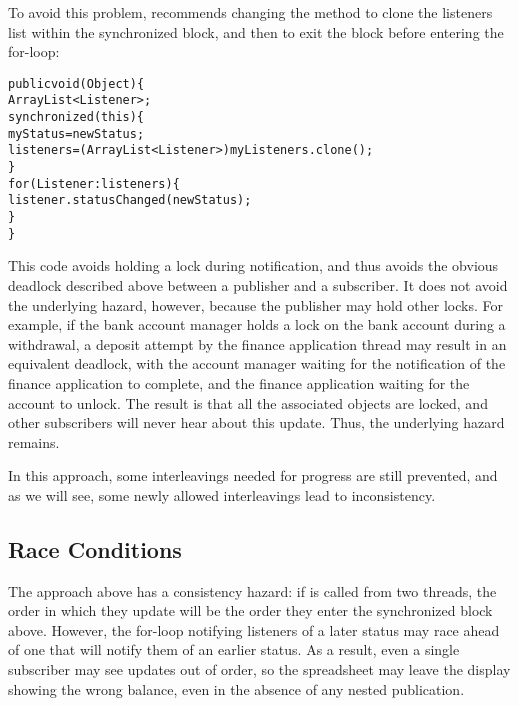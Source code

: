 \documentclass{llncs}
\begin{document}
To avoid this problem, \cite{Englander:beans} recommends changing the
 method to clone the listeners list within the
synchronized block, and then to exit the block before entering the
for-loop:
%
\begin{alltt}
    public void (Object ) \{
        ArrayList<Listener> ;
        synchronized (this) \{
            myStatus = newStatus;
            listeners = (ArrayList<Listener>)myListeners.clone();
        \}
        for (Listener : listeners) \{
            listener.statusChanged(newStatus);
        \}
    \}
\end{alltt}
%
This code avoids holding a lock during notification, and thus avoids
the obvious deadlock described above between a publisher and a
subscriber.  It does not avoid the underlying hazard, however, because
the publisher may hold other locks.  For example, if the bank account
manager holds a lock on the bank account during a withdrawal, a
deposit attempt by the finance application thread may result in an
equivalent deadlock, with the account manager waiting for the
notification of the finance application to complete, and the finance
application waiting for the account to unlock.  The result is that all
the associated objects are locked, and other subscribers will never
hear about this update.  Thus, the underlying hazard remains.

In this approach, some interleavings needed for progress are still
prevented, and as we will see, some newly allowed interleavings lead
to inconsistency.

\subsection{Race Conditions} 

The approach above has a consistency hazard: if  is
called from two threads, the order in which they update 
will be the order they enter the synchronized block above. However,
the for-loop notifying listeners of a later status may race ahead of
one that will notify them of an earlier status. As a result, even a
single subscriber may see updates out of order, so the spreadsheet may
leave the display showing the wrong balance, even in the absence of
any nested publication.
\end{document}
